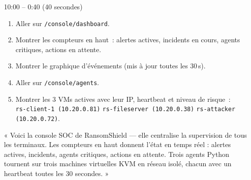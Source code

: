 \documentclass[a4paper,11pt]{article}
\newcommand{\clic}[1]{\texttt{\small #1}}
\begin{document}
\begin{etapebox}{1}{0:00 -- 0:40 \textnormal{(40 secondes)}}

\begin{montrerbox}
\begin{enumerate}[leftmargin=1.5em,itemsep=3pt]
  \item Aller sur \clic{/console/dashboard}.
  \item Montrer les compteurs en haut~: alertes actives, incidents en cours, agents critiques, actions en attente.
  \item Montrer le graphique d'événements (mis à jour toutes les 30\,s).
  \item Aller sur \clic{/console/agents}.
  \item Montrer les 3 VMs actives avec leur IP, heartbeat et niveau de risque~:\\
    \texttt{rs-client-1 (10.20.0.81)} \quad \texttt{rs-fileserver (10.20.0.38)} \quad \texttt{rs-attacker (10.20.0.72)}.
\end{enumerate}
\end{montrerbox}

\vspace{5pt}

\begin{direbox}
« Voici la console SOC de RansomShield — elle centralise la supervision de tous les terminaux.
Les compteurs en haut donnent l'état en temps réel : alertes actives, incidents, agents critiques, actions en attente.
Trois agents Python tournent sur trois machines virtuelles KVM en réseau isolé, chacun avec un heartbeat toutes les 30 secondes. »
\end{direbox}

\end{etapebox}

\vspace{6pt}
\end{document}
